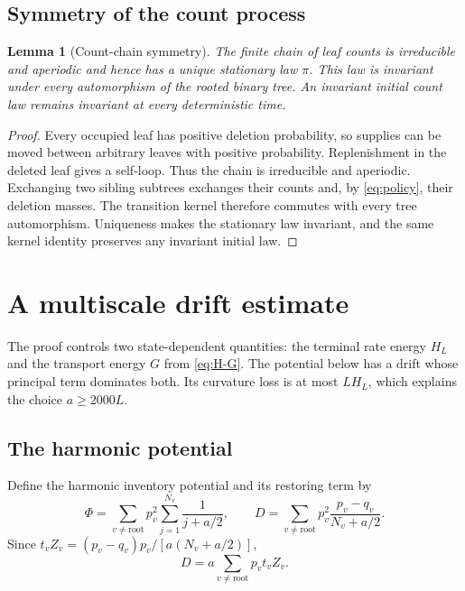 \documentclass[11pt]{article}
\numberwithin{equation}{section}
\newtheorem{lemma}[theorem]{Lemma}
\theoremstyle{remark}
\begin{document}
\subsection{Symmetry of the count process}

\begin{lemma}[Count-chain symmetry]\label{lem:symmetry}
The finite chain of leaf counts is irreducible and aperiodic and hence has
a unique stationary law \(\pi\). This law is invariant under every
automorphism of the rooted binary tree. An invariant initial count law
remains invariant at every deterministic time.
\end{lemma}
\begin{proof}
Every occupied leaf has positive deletion probability, so supplies can be
moved between arbitrary leaves with positive probability. Replenishment in
the deleted leaf gives a self-loop. Thus the chain is irreducible and
aperiodic. Exchanging two sibling subtrees exchanges their counts and,
by \eqref{eq:policy}, their deletion masses. The transition kernel therefore
commutes with every tree automorphism. Uniqueness makes the stationary law
invariant, and the same kernel identity preserves any invariant initial law.
\end{proof}

\section{A multiscale drift estimate}\label{sec:energy}

The proof controls two state-dependent quantities: the terminal rate
energy \(H_L\) and the transport energy \(G\) from \eqref{eq:H-G}.
The potential below has a drift whose principal term dominates both.
Its curvature loss is at most \(LH_L\), which explains the choice
\(a\ge2000L\).

\subsection{The harmonic potential}

Define the harmonic inventory potential and its restoring term by
\begin{equation}\label{eq:Phi-D}
\Phi=\sum_{v\ne\mathrm{root}}p_v^2
\sum_{j=1}^{N_v}\frac1{j+a/2},
\qquad
D=\sum_{v\ne\mathrm{root}}p_v^2
\frac{p_v-q_v}{N_v+a/2}.
\end{equation}
Since \(t_vZ_v=(p_v-q_v)p_v/[a(N_v+a/2)]\),
\begin{equation}\label{eq:D-tZ}
D=a\sum_{v\ne\mathrm{root}}p_vt_vZ_v.
\end{equation}
\end{document}
